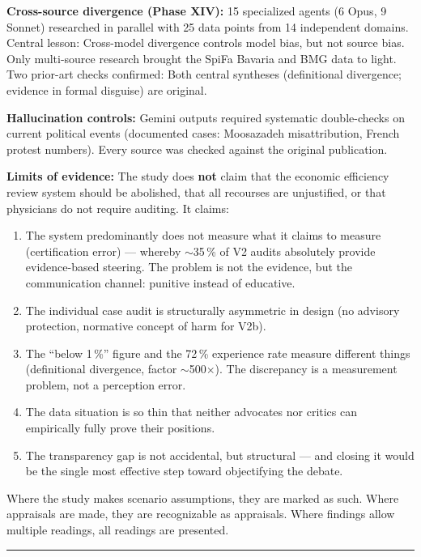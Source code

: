 \documentclass{umbruch-position}
\begin{document}
\textbf{Cross-source divergence (Phase XIV):} 15 specialized agents (6 Opus, 9 Sonnet) researched in parallel with 25 data points from 14 independent domains. Central lesson: Cross-model divergence controls model bias, but not source bias. Only multi-source research brought the SpiFa Bavaria and BMG data to light. Two prior-art checks confirmed: Both central syntheses (definitional divergence; evidence in formal disguise) are original.

\textbf{Hallucination controls:} Gemini outputs required systematic double-checks on current political events (documented cases: Moosazadeh misattribution, French protest numbers). Every source was checked against the original publication.

\textbf{Limits of evidence:} The study does \textbf{not} claim that the economic efficiency review system should be abolished, that all recourses are unjustified, or that physicians do not require auditing. It claims:

\begin{enumerate}
  \item The system predominantly does not measure what it claims to measure (certification error) --- whereby ${\sim}$35\,\% of V2 audits absolutely provide evidence-based steering. The problem is not the evidence, but the communication channel: punitive instead of educative.
  \item The individual case audit is structurally asymmetric in design (no advisory protection, normative concept of harm for V2b).
  \item The ``below 1\,\%'' figure and the 72\,\% experience rate measure different things (definitional divergence, factor ${\sim}$500$\times$). The discrepancy is a measurement problem, not a perception error.
  \item The data situation is so thin that neither advocates nor critics can empirically fully prove their positions.
  \item The transparency gap is not accidental, but structural --- and closing it would be the single most effective step toward objectifying the debate.
\end{enumerate}

Where the study makes scenario assumptions, they are marked as such. Where appraisals are made, they are recognizable as appraisals. Where findings allow multiple readings, all readings are presented.

\vspace{4mm}
\noindent\rule{\textwidth}{0.4pt}
\end{document}
